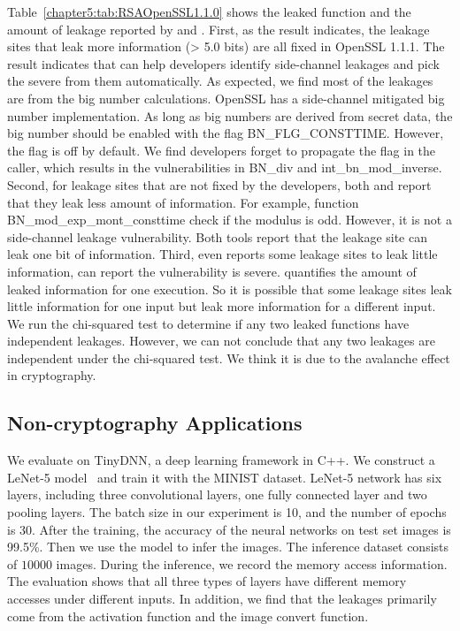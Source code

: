 Table~\ref{chapter5:tab:RSAOpenSSL1.1.0} shows the leaked function and the amount of leakage reported by \tool{} and \ctool{}. First, as the result indicates, the leakage sites that leak more information (> 5.0 bits) are all fixed in OpenSSL 1.1.1. The result indicates that \ctool{} can help developers identify side-channel leakages and pick the severe from them automatically. As expected, we find most of the leakages are from the big number calculations. OpenSSL has a side-channel mitigated big number implementation. As long as big numbers are derived from secret data, the big number should be enabled with the flag \textsf{BN\_FLG\_CONSTTIME}. However, the flag is off by default. We find developers forget to propagate the flag in the caller, which results in the vulnerabilities in \textsf{BN\_div} and \textsf{int\_bn\_mod\_inverse}. Second, for leakage sites that are not fixed by the developers, both \tool{} and \ctool{} report that they leak less amount of information. For example, function \textsf{BN\_mod\_exp\_mont\_consttime} check if the modulus is odd. However, it is not a side-channel leakage vulnerability. Both tools report that the leakage site can leak one bit of information. Third, even \tool{} reports some leakage sites to leak little information, \ctool{} can report the vulnerability is severe. \tool{} quantifies the amount of leaked information for one execution. So it is possible that some leakage sites leak little information for one input but leak more information for a different input. We run the chi-squared test to determine if any two leaked functions have independent leakages. However, we can not conclude that any two leakages are independent under the chi-squared test. We think it is due to the avalanche effect in cryptography.

\subsection{Non-cryptography Applications}



We evaluate \ctool{} on TinyDNN, a deep learning framework in C++. We construct a LeNet-5 model~\cite{lecun1998gradient} and train it with the MINIST dataset. LeNet-5 network has six layers, including three convolutional layers, one fully connected layer and two pooling layers. The batch size in our experiment is 10, and the number of epochs is 30. After the training, the accuracy of the neural networks on test set images is 99.5\%. Then we use the model to infer the images. The inference dataset consists of $10000$ images.  During the inference, we record the memory access information. The evaluation shows that all three types of layers have different memory accesses under different inputs. In addition, we find that the leakages primarily come from the activation function and the image convert function.



